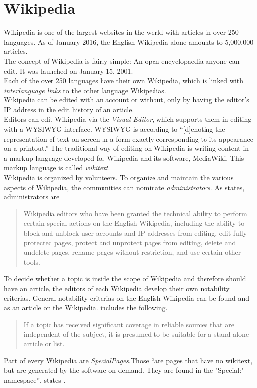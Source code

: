 \section{Wikipedia}
Wikipedia is one of the largest websites in the world with articles in over 250 languages. As of January 2016, the English Wikipedia alone amounts to 5,000,000 articles. \citep{wiki:32} \\
The concept of Wikipedia is fairly simple: An open encyclopaedia anyone can edit. It was launched on January 15, 2001. \citep{wiki:31} \\
Each of the over 250 languages have their own Wikipedia, which is linked with \textit{interlanguage links} to the other language Wikipedias. \\
Wikipedia can be edited with an account or without, only by having the editor's IP address in the edit history of an article. \\
Editors can edit Wikipedia via the \textit{Visual Editor}, which supports them in editing with a WYSIWYG interface. WYSIWYG is according to \citet{wysiwyg} ``[d]enoting the representation of text on-screen in a form exactly corresponding to its appearance on a printout.'' The traditional way of editing on Wikipedia is writing content in a markup language developed for Wikipedia and its software, MediaWiki. This markup language is called \textit{wikitext}. \\
Wikipedia is organized by volunteers. To organize and maintain the various aspects of Wikipedia, the communities can nominate \textit{administrators}.
As \citet{wiki:10} states, administrators are
\begin{quote}
 Wikipedia editors who have been granted the technical ability to perform certain special actions on the English Wikipedia, including the ability to block and unblock user accounts and IP addresses from editing, edit fully protected pages, protect and unprotect pages from editing, delete and undelete pages, rename pages without restriction, and use certain other tools.
\end{quote}

To decide whether a topic is inside the scope of Wikipedia and therefore should have an article, the editors of each Wikipedia develop their own notability criterias. General notability criterias on the English Wikipedia can be found and as an article on the Wikipedia. \citet{wiki:11} includes the following. 
\begin{quote}
 If a topic has received significant coverage in reliable sources that are independent of the subject, it is presumed to be suitable for a stand-alone article or list.
\end{quote}

Part of every Wikipedia are \textit{SpecialPages}.Those ``are pages that have no wikitext, but are generated by the software on demand. They are found in the "Special:" namespace'', states \citet{wiki:12}.


